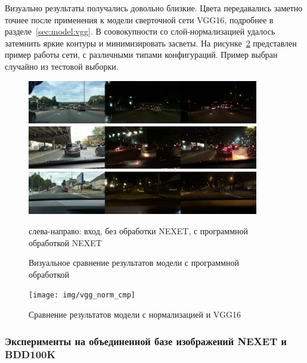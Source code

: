 \documentclass[11pt,a4paper]{extarticle}
\begin{document}
{			Визуально результаты получались довольно близкие.
			Цвета передавались заметно точнее после применения к модели сверточной сети VGG16, подробнее в разделе~\ref{sec:model:vgg}.
			В соовокупности со слой-нормализацией удалось затемнить яркие контуры и минимизировать засветы.
			На рисунке~\ref{pic:vgg_no_vgg} представлен пример работы сети, с различными типами конфигураций.
			Пример выбран случайно из тестовой выборки.  

			\begin{figure}[ht]
				\centering
				\includegraphics[width=0.9\textwidth]{img/example_no_err_2}
				\includegraphics[width=0.9\textwidth]{img/example_no_err_1}
				\includegraphics[width=0.9\textwidth]{img/example_no_err_3}
				\caption{Визуальное сравнение результатов модели с программной обработкой}{
					\small{
						слева-направо: вход, без обработки NEXET, с программной обработкой NEXET
					}
				}
				\label{pic:example_no_err}
			\end{figure}

			\begin{figure}[ht]
				\centering
				\texttt{[image: img/vgg\_norm\_cmp]}
				\caption{Сравнение результатов модели с нормализацией и VGG16}
				
				\label{pic:vgg_no_vgg}
			\end{figure}
			
		\subsubsection{Эксперименты на объединенной базе изображений NEXET и BDD100K}\label{sec:tests:nexet_bdd}
			
}
\end{document}

